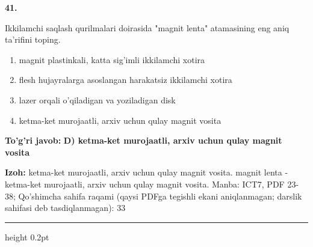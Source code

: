 \documentclass[10pt,a4paper]{article}
\begin{document}
{\bfseries\sffamily\color{ink} 41.}
\par
Ikkilamchi saqlash qurilmalari doirasida "magnit lenta" atamasining eng aniq ta'rifini toping.
\begin{enumerate}[label=\Alph*),leftmargin=9mm]
\item magnit plastinkali, katta sig'imli ikkilamchi xotira
\item flesh hujayralarga asoslangan harakatsiz ikkilamchi xotira
\item lazer orqali o'qiladigan va yoziladigan disk
\item ketma-ket murojaatli, arxiv uchun qulay magnit vosita
\end{enumerate}
\begin{tcolorbox}[enhanced,breakable,colback=teal!4,colframe=teal!60!black,boxrule=0.45pt,arc=1.2mm,left=2.7mm,right=2.7mm,top=1.8mm,bottom=1.8mm,before skip=2mm,after skip=2mm]
{\bfseries\sffamily\color{teal}To'g'ri javob:} \textbf{D) ketma-ket murojaatli, arxiv uchun qulay magnit vosita}
\par\smallskip
{\bfseries Izoh:} ketma-ket murojaatli, arxiv uchun qulay magnit vosita. magnit lenta - ketma-ket murojaatli, arxiv uchun qulay magnit vosita. Manba: ICT7, PDF 23-38; Qo'shimcha sahifa raqami (qaysi PDFga tegishli ekani aniqlanmagan; darslik sahifasi deb tasdiqlanmagan): 33
\end{tcolorbox}
\vspace{2mm}\hrule height 0.2pt\vspace{3mm}
\end{document}
